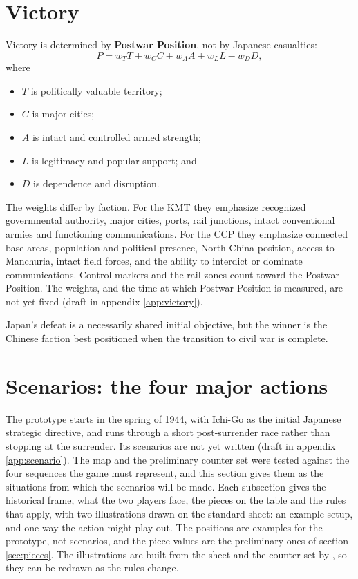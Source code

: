 \documentclass[11pt]{article}
\begin{document}
\section{Victory}\label{sec:victory}
Victory is determined by \textbf{Postwar Position}, not by Japanese casualties:
\[
P=w_T T+w_C C+w_A A+w_L L-w_D D,
\]
where
\begin{itemize}
\item $T$ is politically valuable territory;
\item $C$ is major cities;
\item $A$ is intact and controlled armed strength;
\item $L$ is legitimacy and popular support; and
\item $D$ is dependence and disruption.
\end{itemize}
The weights differ by faction. For the KMT they emphasize recognized governmental authority, major cities, ports, rail junctions, intact conventional armies and functioning communications. For the CCP they emphasize connected base areas, population and political presence, North China position, access to Manchuria, intact field forces, and the ability to interdict or dominate communications. Control markers and the rail zones count toward the Postwar Position. The weights, and the time at which Postwar Position is measured, are not yet fixed (draft in appendix \ref{app:victory}).

Japan's defeat is a necessarily shared initial objective, but the winner is the Chinese faction best positioned when the transition to civil war is complete.

\section{Scenarios: the four major actions}\label{sec:scenarios}
The prototype starts in the spring of 1944, with Ichi-Go as the initial Japanese strategic directive, and runs through a short post-surrender race rather than stopping at the surrender. Its scenarios are not yet written (draft in appendix \ref{app:scenario}). The map and the preliminary counter set were tested against the four sequences the game must represent, and this section gives them as the situations from which the scenarios will be made. Each subsection gives the historical frame, what the two players face, the pieces on the table and the rules that apply, with two illustrations drawn on the standard sheet: an example setup, and one way the action might play out. The positions are examples for the prototype, not scenarios, and the piece values are the preliminary ones of section \ref{sec:pieces}. The illustrations are built from the sheet and the counter set by , so they can be redrawn as the rules change.
\end{document}
